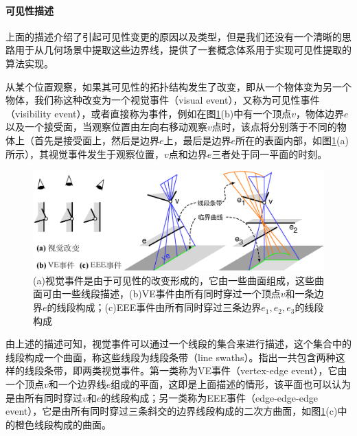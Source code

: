 \paragraph{可见性描述}
上面的描述介绍了引起可见性变更的原因以及类型，但是我们还没有一个清晰的思路用于从几何场景中提取这些边界线，\cite{a:ComputingTheAspectGraphforLineDrawingsofPolyhedralObjects,a:EfficientlyComputingandRepresentingAspectGraphsofPolyhedralObjects}提供了一套概念体系用于实现可见性提取的算法实现。

从某个位置观察，如果其可见性的拓扑结构发生了改变，即从一个物体变为另一个物体，我们称这种改变为一个视觉事件（visual event），又称为可见性事件（visibility event），或者直接称为事件，例如在图\ref{f:r-visual-events}(b)中有一个顶点$v$，物体边界$e$以及一个接受面，当观察位置由左向右移动观察$v$点时，该点将分别落于不同的物体上（首先是接受面上，然后是边界$e$上，最后是边界$e$所在的表面内部，如图\ref{f:r-visual-events}(a)所示），其视觉事件发生于观察位置，$v$点和边界$e$三者处于同一平面的时刻。

\begin{figure}
	\includegraphics[width=1.\textwidth]{figures/r/visual-events}
	\caption{(a)视觉事件是由于可见性的改变形成的，它由一些曲面组成，这些曲面可由一些线段描述，(b)VE事件由所有同时穿过一个顶点$v$和一条边界$e$的线段构成；(c)EEE事件由所有同时穿过三条边界$e_1,e_2,e_3$的线段构成}
	\label{f:r-visual-events}
\end{figure}

由上述的描述可知，视觉事件可以通过一个线段的集合来进行描述，这个集合中的线段构成一个曲面，称这些线段为线段条带（line swaths）。\cite{a:ComputingTheAspectGraphforLineDrawingsofPolyhedralObjects,a:EfficientlyComputingandRepresentingAspectGraphsofPolyhedralObjects}指出一共包含两种这样的线段条带，即两类视觉事件。第一类称为VE事件（vertex-edge event），它由一个顶点$v$和一个边界线$e$组成的平面，这即是上面描述的情形，该平面也可以认为是由所有同时穿过$v$和$e$的线段构成；另一类称为EEE事件（edge-edge-edge event），它是由所有同时穿过三条斜交的边界线段构成的二次方曲面，如图\ref{f:r-visual-events}(c)中的橙色线段构成的曲面。


